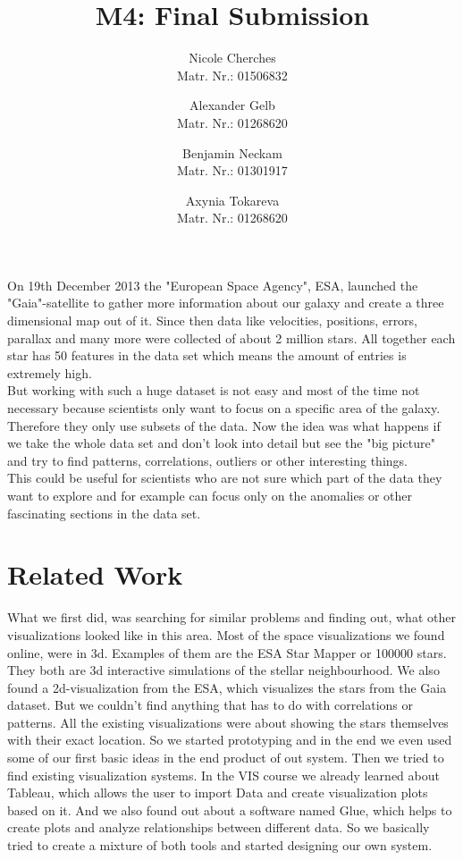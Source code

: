 \documentclass{vgtc}                          %
\title{M4: Final Submission}
\author{Nicole Cherches\\
\scriptsize Matr. Nr.: 01506832
\and Alexander Gelb\\
\scriptsize Matr. Nr.: 01268620
\and Benjamin Neckam\\
\scriptsize Matr. Nr.: 01301917
\and Axynia Tokareva\\
\scriptsize Matr. Nr.: 01268620
}
\begin{document}

\maketitle
On 19th December 2013 the "European Space Agency", ESA, launched  the "Gaia"-satellite to gather more information about our galaxy and create a three dimensional map out of it. Since then data like velocities, positions, errors, parallax and many more were collected of about 2 million stars. All together each star has 50 features in the data set which means the amount of entries is extremely high.\\
But working with such a huge dataset is not easy and most of the time not necessary because scientists only want to focus on a specific area of the galaxy. Therefore they only use subsets of the data. Now the idea was what happens if we take the whole data set and don't look into detail but see the "big picture" and try to find patterns, correlations, outliers or other interesting things.\\
This could be useful for scientists who are not sure which part of the data they want to explore and for example can focus only on the anomalies or other fascinating sections in the data set.

\section{Related Work}
What we first did, was searching for similar problems and finding out, what other visualizations looked like in this area. Most of the space visualizations we found online, were in 3d. Examples of them are the ESA Star Mapper\cite{starmapper} or 100000 stars\cite{chromeexperiment}. They both are 3d interactive simulations of the stellar neighbourhood.
We also found a 2d-visualization from the ESA, which visualizes the stars from the Gaia dataset\cite{gavs}.
But we couldn't find anything that has to do with correlations or patterns. All the existing visualizations were about showing the stars themselves with their exact location.
So we started prototyping and in the end we even used some of our first basic ideas in the end product of out system.
Then we tried to find existing visualization systems. In the VIS course we already learned about Tableau\cite{tableau}, which allows the user to import Data and create visualization plots based on it. And we also found out about a software named Glue\cite{glue}, which helps to create plots and analyze relationships between different data.
So we basically tried to create a mixture of both tools and started designing our own system.
\end{document}
